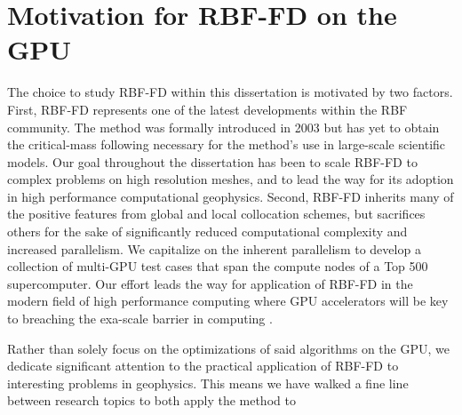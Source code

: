 \section{Motivation for RBF-FD on the GPU} 
The choice to study RBF-FD within this dissertation is motivated by two factors. First, RBF-FD represents one of the latest developments within the RBF community. The method was formally introduced in 2003 but has yet to obtain the critical-mass following necessary for the method's use in large-scale scientific models. Our goal throughout the dissertation has been to scale RBF-FD to complex problems on high resolution meshes, and to lead the way for its adoption in high performance computational geophysics. Second, RBF-FD inherits many of the positive features from global and local collocation schemes, but sacrifices others for the sake of significantly reduced computational complexity and increased parallelism. We capitalize on the inherent parallelism to develop a collection of multi-GPU test cases that span the compute nodes of a Top 500 supercomputer. Our effort leads the way for application of RBF-FD in the modern field of high performance computing where GPU accelerators will be key to breaching the exa-scale barrier in computing \cite{GPUandExascale2011}.


Rather than solely focus on the optimizations of said algorithms on the GPU, we dedicate significant attention to the practical application of RBF-FD to interesting problems in geophysics. This means we have walked a fine line between research topics to both apply the method to 



